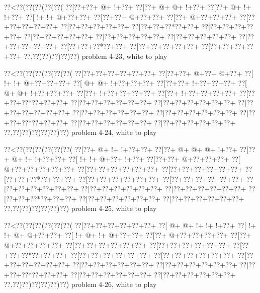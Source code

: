 \vbox{\vbox{\goo
\0??<\0??(\0??(\0??(\0??(\0??(
\0??[\0??+\0??+\- @+\- !+\0??+
\0??[\0??+\- @+\- @+\- !+\0??+
\0??[\0??+\- @+\- !+\- !+\0??+
\0??[\- !+\- !+\- @+\0??+\0??+
\0??[\0??+\0??+\- @+\0??+\0??+
\0??[\0??+\- @+\0??+\0??+\0??+
\0??[\0??+\0??+\0??+\0??+\0??+
\0??[\0??+\0??+\0??+\0??+\0??+
\0??[\0??+\0??+\0??*\0??+\0??+
\0??[\0??+\0??+\0??+\0??+\0??+
\0??[\0??+\0??+\0??+\0??+\0??+
\0??[\0??+\0??+\0??+\0??+\0??+
\0??[\0??+\0??+\0??+\0??+\0??+
\0??[\0??+\0??+\0??+\0??+\0??+
\0??[\0??+\0??+\0??*\0??+\0??+
\0??[\0??+\0??+\0??+\0??+\0??+
\0??[\0??+\0??+\0??+\0??+\0??+
\0??,\0??)\0??)\0??)\0??)\0??)
}
\hfil problem 4-23, white to play\hfil\break
}

\vbox{\vbox{\goo
\0??<\0??(\0??(\0??(\0??(\0??(\0??(
\0??[\0??+\0??+\0??+\0??+\0??+\0??+
\0??[\0??+\0??+\- @+\0??+\- @+\0??+
\0??[\- !+\- !+\- @+\0??+\0??+\0??+
\0??[\- @+\- @+\- !+\0??+\0??+\0??+
\0??[\0??+\0??+\- !+\0??+\0??+\0??+
\0??[\- @+\- @+\- !+\0??+\0??+\0??+
\0??[\0??+\- !+\0??+\0??+\0??+\0??+
\0??[\0??+\- !+\0??+\0??+\0??+\0??+
\0??[\0??+\0??+\0??*\0??+\0??+\0??+
\0??[\0??+\0??+\0??+\0??+\0??+\0??+
\0??[\0??+\0??+\0??+\0??+\0??+\0??+
\0??[\0??+\0??+\0??+\0??+\0??+\0??+
\0??[\0??+\0??+\0??+\0??+\0??+\0??+
\0??[\0??+\0??+\0??+\0??+\0??+\0??+
\0??[\0??+\0??+\0??*\0??+\0??+\0??+
\0??[\0??+\0??+\0??+\0??+\0??+\0??+
\0??[\0??+\0??+\0??+\0??+\0??+\0??+
\0??,\0??)\0??)\0??)\0??)\0??)\0??)
}
\hfil problem 4-24, white to play\hfil\break
}

\vbox{\vbox{\goo
\0??<\0??(\0??(\0??(\0??(\0??(\0??(
\0??[\0??+\- @+\- !+\- !+\0??+\0??+
\0??[\0??+\- @+\- @+\- @+\- !+\0??+
\0??[\0??+\- @+\- !+\- !+\0??+\0??+
\0??[\- !+\- !+\- @+\0??+\- !+\0??+
\0??[\0??+\0??+\- @+\0??+\0??+\0??+
\0??[\- @+\0??+\0??+\0??+\0??+\0??+
\0??[\0??+\0??+\0??+\0??+\0??+\0??+
\0??[\0??+\0??+\0??+\0??+\0??+\0??+
\0??[\0??+\0??+\0??*\0??+\0??+\0??+
\0??[\0??+\0??+\0??+\0??+\0??+\0??+
\0??[\0??+\0??+\0??+\0??+\0??+\0??+
\0??[\0??+\0??+\0??+\0??+\0??+\0??+
\0??[\0??+\0??+\0??+\0??+\0??+\0??+
\0??[\0??+\0??+\0??+\0??+\0??+\0??+
\0??[\0??+\0??+\0??*\0??+\0??+\0??+
\0??[\0??+\0??+\0??+\0??+\0??+\0??+
\0??[\0??+\0??+\0??+\0??+\0??+\0??+
\0??,\0??)\0??)\0??)\0??)\0??)\0??)
}
\hfil problem 4-25, white to play\hfil\break
}

\vbox{\vbox{\goo
\0??<\0??(\0??(\0??(\0??(\0??(\0??(
\0??[\0??+\0??+\0??+\0??+\0??+\0??+
\0??[\- @+\- @+\- !+\- !+\- !+\0??+
\0??[\- !+\- !+\- @+\- @+\0??+\0??+
\0??[\- !+\- @+\- !+\- @+\0??+\0??+
\0??[\0??+\- @+\0??+\0??+\0??+\0??+
\0??[\0??+\- @+\0??+\0??+\0??+\0??+
\0??[\0??+\0??+\0??+\0??+\0??+\0??+
\0??[\0??+\0??+\0??+\0??+\0??+\0??+
\0??[\0??+\0??+\0??*\0??+\0??+\0??+
\0??[\0??+\0??+\0??+\0??+\0??+\0??+
\0??[\0??+\0??+\0??+\0??+\0??+\0??+
\0??[\0??+\0??+\0??+\0??+\0??+\0??+
\0??[\0??+\0??+\0??+\0??+\0??+\0??+
\0??[\0??+\0??+\0??+\0??+\0??+\0??+
\0??[\0??+\0??+\0??*\0??+\0??+\0??+
\0??[\0??+\0??+\0??+\0??+\0??+\0??+
\0??[\0??+\0??+\0??+\0??+\0??+\0??+
\0??,\0??)\0??)\0??)\0??)\0??)\0??)
}
\hfil problem 4-26, white to play\hfil\break
}

